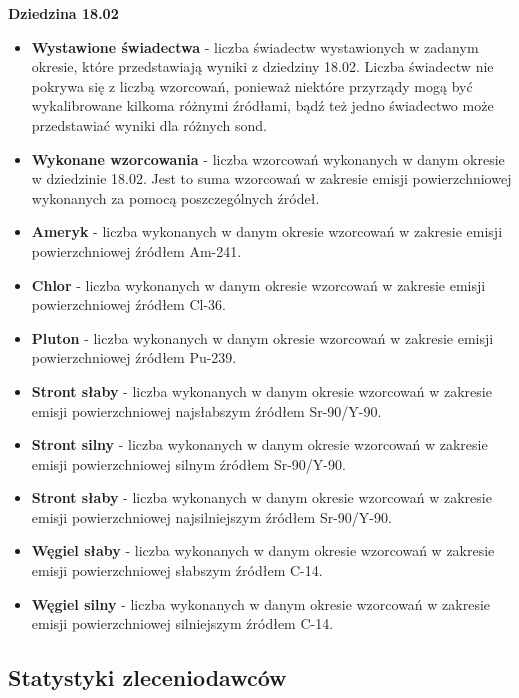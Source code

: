 \textbf{Dziedzina 18.02}
\begin{itemize}
	\item \textbf{Wystawione świadectwa} - liczba świadectw wystawionych w zadanym okresie, które przedstawiają wyniki z dziedziny 18.02. Liczba świadectw nie pokrywa się z liczbą wzorcowań, ponieważ niektóre przyrządy mogą być wykalibrowane kilkoma różnymi źródłami, bądź też jedno świadectwo może przedstawiać wyniki dla różnych sond.
	\item \textbf{Wykonane wzorcowania} - liczba wzorcowań wykonanych w danym okresie w dziedzinie 18.02. Jest to suma wzorcowań w zakresie emisji powierzchniowej wykonanych za pomocą poszczególnych źródeł.
	\item \textbf{Ameryk} - liczba wykonanych w danym okresie wzorcowań w zakresie emisji powierzchniowej źródłem Am-241.
	\item \textbf{Chlor} - liczba wykonanych w danym okresie wzorcowań w zakresie emisji powierzchniowej źródłem Cl-36.
	\item \textbf{Pluton} - liczba wykonanych w danym okresie wzorcowań w zakresie emisji powierzchniowej źródłem Pu-239.
	\item \textbf{Stront słaby} - liczba wykonanych w danym okresie wzorcowań w zakresie emisji powierzchniowej najsłabszym źródłem Sr-90/Y-90.
	\item \textbf{Stront silny} - liczba wykonanych w danym okresie wzorcowań w zakresie emisji powierzchniowej silnym źródłem Sr-90/Y-90.
	\item \textbf{Stront słaby} - liczba wykonanych w danym okresie wzorcowań w zakresie emisji powierzchniowej najsilniejszym źródłem Sr-90/Y-90.
	\item \textbf{Węgiel słaby} - liczba wykonanych w danym okresie wzorcowań w zakresie emisji powierzchniowej słabszym źródłem C-14.
	\item \textbf{Węgiel silny} - liczba wykonanych w danym okresie wzorcowań w zakresie emisji powierzchniowej silniejszym źródłem C-14.
\end{itemize}

\subsection{Statystyki zleceniodawców}
\label{stat_zleceniodawcy}

